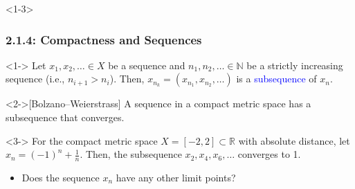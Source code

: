 \documentclass[10pt,english,aspectratio=169]{beamer}
\begin{document}
\begin{frame}<1-3>
\frametitle{2.1.4: Compactness and Sequences}

\begin{definition}<1->
Let $x_1,x_2,\ldots \in X$ be a sequence and $n_1,n_2,\ldots\in \mathbb{N}$ be
a strictly increasing sequence (i.e., $n_{i+1}>n_i$).
Then, $x_{n_k} = (x_{n_1},x_{n_2},\ldots)$ is a \textcolor{blue}{subsequence} of $x_n$.
\end{definition}

\begin{theorem}<2->[Bolzano--Weierstrass]
A sequence in a compact metric space has a subsequence that converges.
\end{theorem}

\begin{example}<3->
For the compact metric space $X=[-2,2]\subset \mathbb{R}$ with absolute distance, let $x_n = (-1)^n + \frac{1}{n}$.
Then, the subsequence $x_2,x_4,x_6,\ldots$ converges to 1.
\end{example}

\begin{itemize}
\item<3-> Does the sequence $x_n$ have any other limit points?
\end{itemize}


\end{frame}
\end{document}
